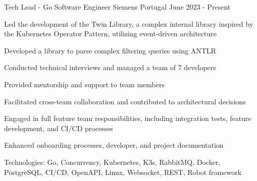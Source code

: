 

\begin{cventries}

  \cventry
    {Tech Lead - Go Software Engineer} %
    {Siemens} %
    {Portugal} %
    {June 2023 - Present} %
    {
      \begin{cvitems} %
        \item {Led the development of the Twin Library, a complex internal library inspired by the Kubernetes Operator Pattern, utilizing event-driven architecture}
        \item {Developed a library to parse complex filtering queries using ANTLR}
        \item {Conducted technical interviews and managed a team of 7 developers}
        \item {Provided mentorship and support to team members}
        \item {Facilitated cross-team collaboration and contributed to architectural decisions}
        \item {Engaged in full feature team responsibilities, including integration tests, feature development, and CI/CD processes}
        \item {Enhanced onboarding processes, developer, and project documentation}
        \item {Technologies: Go, Concurrency, Kubernetes, K3s, RabbitMQ, Docker, PostgreSQL, CI/CD, OpenAPI, Linux, Websocket, REST, Robot framework}
      \end{cvitems}
    }


\end{cventries}
